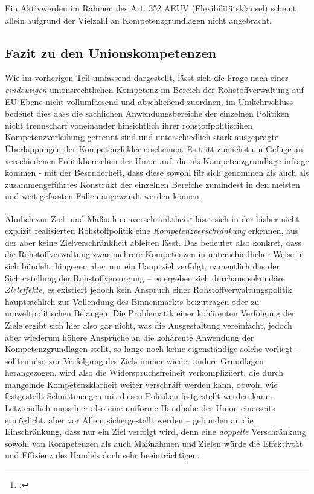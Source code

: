 \documentclass[12pt,a4paper,oneside]{book} %
\begin{document}
	Ein Aktivwerden im Rahmen des Art. 352 AEUV (\glqq Flexibilitätsklausel\grqq) scheint allein aufgrund der Vielzahl an Kompetenzgrundlagen nicht angebracht.
	
	\subsection{Fazit zu den Unionskompetenzen}
	Wie im vorherigen Teil umfassend dargestellt, lässt sich die Frage nach einer \textit{eindeutigen} unionsrechtlichen Kompetenz im Bereich der Rohstoffverwaltung auf EU-Ebene nicht vollumfassend und abschließend zuordnen, im Umkehrschluss bedeuet dies dass die sachlichen Anwendungsbereiche der einzelnen Politiken nicht trennscharf voneinander hinsichtlich ihrer rohstoffpolitiscihen Kompetenzverleihung getrennt sind und unterschiedlich stark ausgeprägte Überlappungen der Kompetenzfelder erscheinen. Es tritt zunächst ein Gefüge an verschiedenen Politikbereichen der Union auf, die als Kompetenzgrundlage infrage kommen - mit der Besonderheit, dass diese sowohl für sich genommen als auch als zusammengeführtes Konstrukt der einzelnen Bereiche zumindest in den meisten und weit gefassten Fällen angewandt werden können.
	
	Ähnlich zur \glqq Ziel- und Maßnahmenverschränktheit\grqq \footcite[siehe zu diesem Begriff]{Callies, Berliner Online Beiträge zum Europarecht, Nr 52} lässt sich in der bisher nicht explizit realisierten Rohstoffpolitik eine \textit{Kompetenzverschränkung} erkennen, aus der aber keine Zielverschränkheit ableiten lässt. Das bedeutet also konkret, dass die Rohstoffverwaltung zwar mehrere Kompetenzen in unterschiedlicher Weise in sich bündelt, hingegen aber nur ein Hauptziel verfolgt, namentlich das der Sicherstellung der Rohstoffversorgung -- es ergeben sich durchaus sekundäre \textit{Zieleffekte}, es existiert jedoch kein Anspruch einer Rohstoffverwaltungspolitik hauptsächlich zur Vollendung des Binnenmarkts beizutragen oder zu umweltpolitischen Belangen. Die Problematik einer kohärenten Verfolgung der Ziele ergibt sich hier also gar nicht, was die Ausgestaltung vereinfacht, jedoch aber wiederum höhere Ansprüche an die kohärente Anwendung der Kompetenzgrundlagen stellt, so lange noch keine eigenständige solche vorliegt -- sollten also zur Verfolgung des Ziels immer wieder andere Grundlagen herangezogen, wird also die Widerspruchsfreiheit verkompliziiert, die durch mangelnde Kompetenzklarheit weiter verschräft werden kann, obwohl wie festgestellt Schnittmengen mit diesen Politiken festgestellt werden kann. Letztendlich muss hier also eine uniforme Handhabe der Union einerseits ermöglicht, aber vor Allem sichergestellt werden -- gebunden an die Einschränkung, dass nur ein Ziel verfolgt wird, denn eine \textit{doppelte} Verschränkung sowohl von Kompetenzen als auch Maßnahmen und Zielen würde die Effektivtät und Effizienz des Handels doch sehr beeinträchtigen.
	
\end{document}
